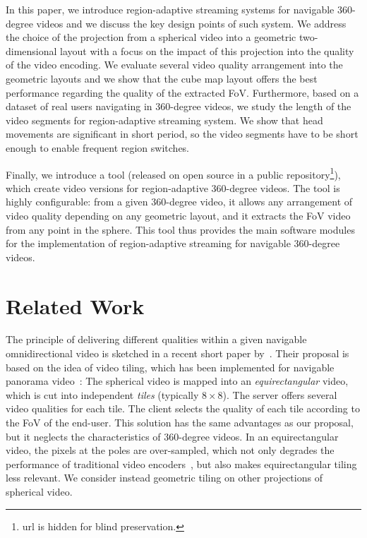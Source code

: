 In this paper, we introduce region-adaptive streaming systems for navigable 360-degree
videos and we discuss the key design points of such system. We address
the choice of the projection from a spherical video into a geometric two-dimensional layout
with a focus on the impact of this projection into the quality of the video encoding. We evaluate
several video quality arrangement into the geometric layouts and we show that the 
cube map layout offers the best performance regarding the quality of the extracted 
\ac{FoV}.
Furthermore, based on a dataset of
real users navigating in 360-degree videos, we study the length of the video segments
for region-adaptive streaming system. We show that head movements are significant
in short period, so the video segments have to be short enough to enable 
frequent region switches.

Finally, we introduce a tool (released on open source in a public
repository\footnote{url is hidden for blind
preservation.}), which create video versions for region-adaptive 360-degree videos.
The tool is highly configurable: from a given 360-degree video, it allows
any arrangement of video quality depending on any geometric layout, and it
extracts the
\ac{FoV} video from any point in the sphere. This tool thus provides the
main software modules for the implementation of region-adaptive streaming
for navigable 360-degree videos.


\section{Related Work}
\label{sec:relatedwork}

The principle of delivering different qualities within a given navigable omnidirectional video is sketched
in a recent short paper by~\citet{ochi_live_2015}. Their proposal is based on the idea of video
tiling, which has been implemented for navigable panorama
video~\cite{sanchez_compressed_2015,wang_mixing_2014,gaddam_tiling_2015}:
The spherical video is mapped into an \emph{equirectangular} video, which
is cut into independent \emph{tiles} (typically $8\times 8$). The server offers several
video qualities for each tile. The client selects the quality of each tile according to
the \ac{FoV} of the end-user. This
solution has the same advantages as our proposal, but it neglects
the characteristics of 360-degree
videos. In an equirectangular video, the pixels
at the poles are over-sampled, which not only degrades the
performance of traditional video encoders~\cite{wojciechowski_h.264_2006,yu_framework_2015}, but also
makes equirectangular tiling less relevant. We consider instead geometric tiling on
other projections of spherical video.


